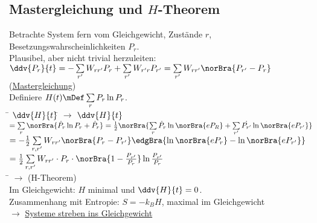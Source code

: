 \subsection{Mastergleichung und $H$-Theorem}
\begin{tabbing}
Betrachte System fern vom Gleichgewicht, Zustände $r$, Besetzungswahrscheinlichkeiten $P_r$.\\
Plausibel, aber nicht trivial herzuleiten:\\
$\ddv{P_r}{t} = - \sum\limits_{r'} W_{r r'} P_r + \sum\limits_{r'} W_{r' r} P_{r'} = \sum\limits_{r'} W_{r r'} \norBra{P_{r'} - P_r}$ (\underline{Mastergleichung})\\
Definiere $H(t) \mDef \sum\limits_r P_r \ln P_r$.\\
\hspace{4em} \= $\ddv{H}{t}$\= \kill
$\rightarrow$\> $\ddv{H}{t}$\>$= \sum\limits_r \norBra{\dot{P}_r\ln P_r + \dot{P}_r} = \frac{1}{2}\norBra{\sum\limits_r \dot{P}_r \ln\norBra{e P_R} + \sum\limits_{r'} \dot{P_{r'}}\ln\norBra{e P_{r'}}}$\\
\>\> $= -\frac12 \sum\limits_{r,r'} W_{r r'} \norBra{P_r - P_{r'}}\edgBra{\ln\norBra{e P_r} - \ln\norBra{e P_{r'}}}$\\
\>\> $= \frac12 \sum\limits_{r, r'} W_{r r'} \cdot P_r \cdot \norBra{1 - \frac{P_{r'}}{P_r}}\ln\frac{P_{r'}}{P_r}$\\
\hspace{4em} \= \kill
$\rightarrow$\>  (H-Theorem)\\
Im Gleichgewicht:  $H$ minimal und $\ddv{H}{t} = 0$.\\
Zusammenhang mit Entropie: $S = -k_B H$, maximal im Gleichgewicht\\
$\rightarrow$\> \underline{Systeme streben ins Gleichgewicht}
\end{tabbing}

